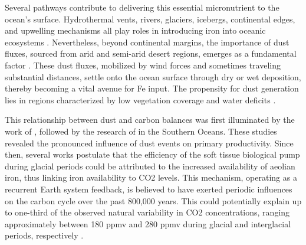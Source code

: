 Several pathways contribute to delivering this essential micronutrient to the ocean's surface. Hydrothermal vents, rivers, glaciers, icebergs, continental edges, and upwelling mechanisms all play roles in introducing iron into oceanic ecosystems \citep{ducklow2003role,tagliabue2016well}. Nevertheless, beyond continental margins, the importance of dust fluxes, sourced from arid and semi-arid desert regions, emerges as a fundamental factor \citep{tagliabue2017integral,lambert2021regional}. These dust fluxes, mobilized by wind forces and sometimes traveling substantial distances, settle onto the ocean surface through dry or wet deposition, thereby becoming a vital avenue for Fe input. The propensity for dust generation lies in regions characterized by low vegetation coverage and water deficits \citep{prospero2003african,prospero2002environmental,jickells2005global,mahowald2005atmospheric,buseck2008nanoparticles,hand2003estimates}.

This relationship between dust and carbon balances was first illuminated by the work of \cite{gran1931conditions}, followed by the research of \cite{martin1990glacial} in the Southern Oceans. These studies revealed the pronounced influence of dust events on primary productivity. Since then, several works \citep{kohfeld2005role,jaccard2013two,petit1990palaeoclimatological,steffensen1997size,lambert2008dust,archer2000caused} postulate that the efficiency of the soft tissue biological pump during glacial periods could be attributed to the increased availability of aeolian iron, thus linking iron availability to CO2 levels. This mechanism, operating as a recurrent Earth system feedback, is believed to have exerted periodic influences on the carbon cycle over the past 800,000 years. This could potentially explain up to one-third of the observed natural variability in CO2 concentrations, ranging approximately between 180 ppmv and 280 ppmv during glacial and interglacial periods, respectively \citep{petit1990palaeoclimatological,siegenthaler2005stable,luthi2008high}.

